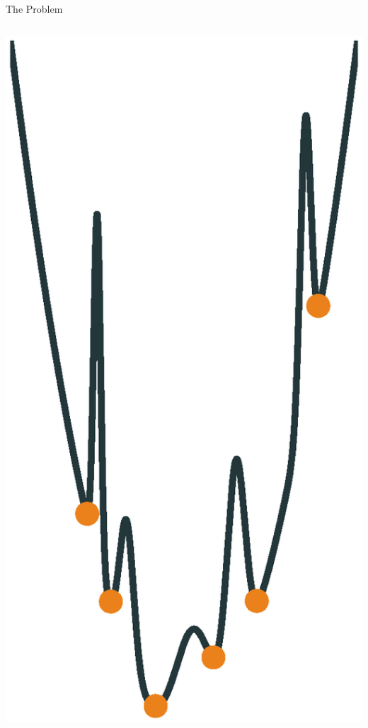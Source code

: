 \documentclass[10pt]{beamer}
\begin{document}
{\begin{frame}[fragile]{The Problem}
\begin{columns}{}
\begin{column}{0.45\textwidth}
\begin{overprint}
				\includegraphics[width=0.9\linewidth]{images/manymins.eps}

\end{overprint}
\end{column}
\end{columns}
\end{frame}}
\end{document}
